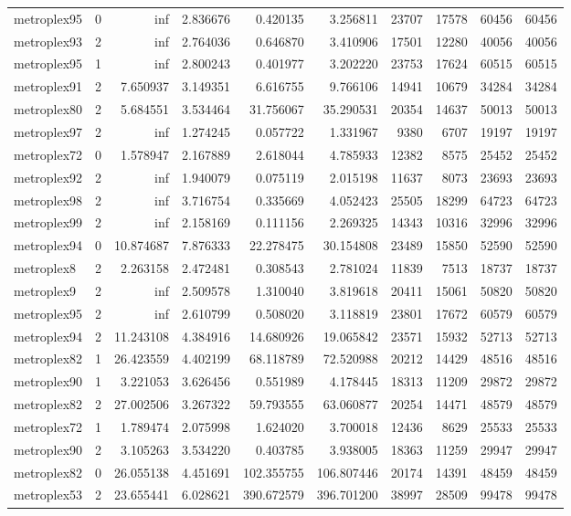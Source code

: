 \begin{longtable}{|l|r|r|r|r|r|r|r|r|r|}
metroplex95 & 0 & inf & 2.836676 & 0.420135 & 3.256811 & 23707 & 17578 & 60456 & 60456 \\
metroplex93 & 2 & inf & 2.764036 & 0.646870 & 3.410906 & 17501 & 12280 & 40056 & 40056 \\
metroplex95 & 1 & inf & 2.800243 & 0.401977 & 3.202220 & 23753 & 17624 & 60515 & 60515 \\
metroplex91 & 2 & 7.650937 & 3.149351 & 6.616755 & 9.766106 & 14941 & 10679 & 34284 & 34284 \\
metroplex80 & 2 & 5.684551 & 3.534464 & 31.756067 & 35.290531 & 20354 & 14637 & 50013 & 50013 \\
metroplex97 & 2 & inf & 1.274245 & 0.057722 & 1.331967 & 9380 & 6707 & 19197 & 19197 \\
metroplex72 & 0 & 1.578947 & 2.167889 & 2.618044 & 4.785933 & 12382 & 8575 & 25452 & 25452 \\
metroplex92 & 2 & inf & 1.940079 & 0.075119 & 2.015198 & 11637 & 8073 & 23693 & 23693 \\
metroplex98 & 2 & inf & 3.716754 & 0.335669 & 4.052423 & 25505 & 18299 & 64723 & 64723 \\
metroplex99 & 2 & inf & 2.158169 & 0.111156 & 2.269325 & 14343 & 10316 & 32996 & 32996 \\
metroplex94 & 0 & 10.874687 & 7.876333 & 22.278475 & 30.154808 & 23489 & 15850 & 52590 & 52590 \\
metroplex8 & 2 & 2.263158 & 2.472481 & 0.308543 & 2.781024 & 11839 & 7513 & 18737 & 18737 \\
metroplex9 & 2 & inf & 2.509578 & 1.310040 & 3.819618 & 20411 & 15061 & 50820 & 50820 \\
metroplex95 & 2 & inf & 2.610799 & 0.508020 & 3.118819 & 23801 & 17672 & 60579 & 60579 \\
metroplex94 & 2 & 11.243108 & 4.384916 & 14.680926 & 19.065842 & 23571 & 15932 & 52713 & 52713 \\
metroplex82 & 1 & 26.423559 & 4.402199 & 68.118789 & 72.520988 & 20212 & 14429 & 48516 & 48516 \\
metroplex90 & 1 & 3.221053 & 3.626456 & 0.551989 & 4.178445 & 18313 & 11209 & 29872 & 29872 \\
metroplex82 & 2 & 27.002506 & 3.267322 & 59.793555 & 63.060877 & 20254 & 14471 & 48579 & 48579 \\
metroplex72 & 1 & 1.789474 & 2.075998 & 1.624020 & 3.700018 & 12436 & 8629 & 25533 & 25533 \\
metroplex90 & 2 & 3.105263 & 3.534220 & 0.403785 & 3.938005 & 18363 & 11259 & 29947 & 29947 \\
metroplex82 & 0 & 26.055138 & 4.451691 & 102.355755 & 106.807446 & 20174 & 14391 & 48459 & 48459 \\
metroplex53 & 2 & 23.655441 & 6.028621 & 390.672579 & 396.701200 & 38997 & 28509 & 99478 & 99478 \\
\end{longtable}
